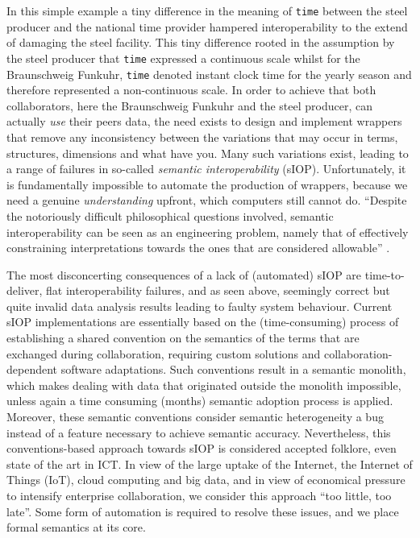 \documentclass[sort&compress,preprint,authoryear,3p,twocolumn]{elsarticle}
\begin{document}
In this simple example a tiny difference in the meaning of \texttt{time}
between the steel producer and the national time provider hampered
interoperability to the extend of damaging the steel facility. This tiny
difference rooted in the assumption by the steel producer that
\texttt{time} expressed a continuous scale whilst for the Braunschweig
Funkuhr, \texttt{time} denoted instant clock time for the yearly season
and therefore represented a non-continuous scale. In order to achieve
that both collaborators, here the Braunschweig Funkuhr and the steel
producer, can actually \emph{use} their peers data, the need exists to
design and implement wrappers that remove any inconsistency between the
variations that may occur in terms, structures, dimensions and what have
you. Many such variations exist, leading to a range of failures in
so-called \emph{semantic interoperability} (sIOP). Unfortunately, it is
fundamentally impossible to automate the production of wrappers, because
we need a genuine \emph{understanding} upfront, which computers still
cannot do. ``Despite the notoriously difficult philosophical questions
involved, semantic interoperability can be seen as an engineering
problem, namely that of effectively constraining interpretations towards
the ones that are considered allowable'' \citep[p.5, based on
\citet{Kuhn2009}]{Scheider:2012tj}.

The most disconcerting consequences of a lack of (automated) sIOP are
time-to-deliver, flat interoperability failures, and as seen above,
seemingly correct but quite invalid data analysis results leading to
faulty system behaviour. Current sIOP implementations are essentially
based on the (time-consuming) process of establishing a shared
convention on the semantics of the terms that are exchanged during
collaboration, requiring custom solutions and collaboration-dependent
software adaptations. Such conventions result in a semantic monolith,
which makes dealing with data that originated outside the monolith
impossible, unless again a time consuming (months) semantic adoption
process is applied. Moreover, these semantic conventions consider
semantic heterogeneity a bug instead of a feature necessary to achieve
semantic accuracy. Nevertheless, this conventions-based approach towards
sIOP is considered accepted folklore, even state of the art in ICT. In
view of the large uptake of the Internet, the Internet of Things (IoT),
cloud computing and big data, and in view of economical pressure to
intensify enterprise collaboration, we consider this approach ``too
little, too late''. Some form of automation is required to resolve these
issues, and we place formal semantics at its core.
\end{document}
